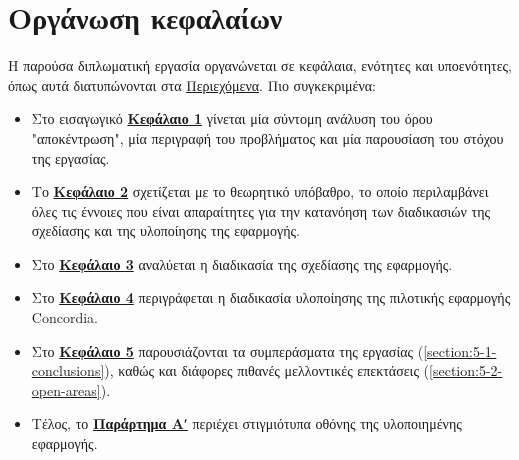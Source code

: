 \section{Οργάνωση κεφαλαίων}\label{section:1-7-document-structure}

Η παρούσα διπλωματική εργασία οργανώνεται σε κεφάλαια, ενότητες και υποενότητες, όπως αυτά διατυπώνονται στα \hyperref[toc]{Περιεχόμενα}. Πιο συγκεκριμένα:

\begin{itemize}
	\item Στο εισαγωγικό \hyperref[chapter:1-introduction]{\textbf{Κεφάλαιο 1}} γίνεται μία σύντομη ανάλυση του όρου "αποκέντρωση", μία περιγραφή του προβλήματος και μία παρουσίαση του στόχου της εργασίας.
	\item Το \hyperref[chapter:2-theoretical-background]{\textbf{Κεφάλαιο 2}} σχετίζεται με το θεωρητικό υπόβαθρο, το οποίο περιλαμβάνει όλες τις έννοιες που είναι απαραίτητες για την κατανόηση των διαδικασιών της σχεδίασης και της υλοποίησης της εφαρμογής.
	\item Στο \hyperref[chapter:3-application-design]{\textbf{Κεφάλαιο 3}} αναλύεται η διαδικασία της σχεδίασης της εφαρμογής.
	\item Στο \hyperref[chapter:4-application-implementation]{\textbf{Κεφάλαιο 4}} περιγράφεται η διαδικασία υλοποίησης της πιλοτικής εφαρμογής Concordia.
	\item Στο \hyperref[chapter:5-conclusions-open-areas]{\textbf{Κεφάλαιο 5}} παρουσιάζονται τα συμπεράσματα της εργασίας (\ref{section:5-1-conclusions}), καθώς και διάφορες πιθανές μελλοντικές επεκτάσεις (\ref{section:5-2-open-areas}).
	\item Τέλος, το \hyperref[{screenshots-appendix}]{\textbf{Παράρτημα Αʹ}} περιέχει στιγμιότυπα οθόνης της υλοποιημένης εφαρμογής.
\end{itemize}
